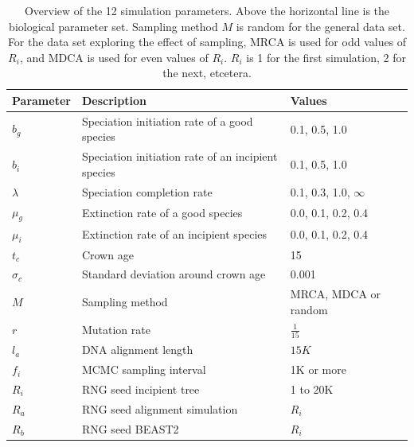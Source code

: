 \documentclass{article}
\begin{document}
\begin{table}
  \centering 
  \begin{tabular}{l l l}
    \hline
    Parameter             & Description & Values \\
    \hline
    \hline
    $b_g$                 & Speciation initiation rate of a good species & 0.1, 0.5, 1.0 \\
    $b_i$                 & Speciation initiation rate of an incipient species & 0.1, 0.5, 1.0 \\
    $\lambda$             & Speciation completion rate & 0.1, 0.3, 1.0, $\infty$ \\
    $\mu_g$               & Extinction rate of a good species & 0.0, 0.1, 0.2, 0.4 \\
    $\mu_i$               & Extinction rate of an incipient species & 0.0, 0.1, 0.2, 0.4 \\
    \hline
    $t_c$                 & Crown age & 15 \\
    $\sigma_c$            & Standard deviation around crown age & 0.001 \\
    $M$                   & Sampling method & MRCA, MDCA or random \\
    $r$                   & Mutation rate & $\frac{1}{15}$ \\
    $l_a$                 & DNA alignment length & $15K$ \\
    $f_i$                 & MCMC sampling interval & 1K or more \\
    $R_i$                 & RNG seed incipient tree & 1 to 20K \\
    $R_a$                 & RNG seed alignment simulation & $R_i$ \\
    $R_b$                 & RNG seed BEAST2 & $R_i$ \\
    \hline
  \end{tabular}
  \caption{
    Overview of the 12 simulation parameters. Above the horizontal line is 
    the biological parameter set. Sampling method $M$ is random for the general
    data set. For the data set exploring the effect of sampling, MRCA is
    used for odd values of $R_i$, and MDCA is used for even values of $R_i$.
    $R_i$ is 1 for the first simulation, 2 for the next, etcetera.
  }
  \label{table:parameters}
\end{table}
\end{document}
